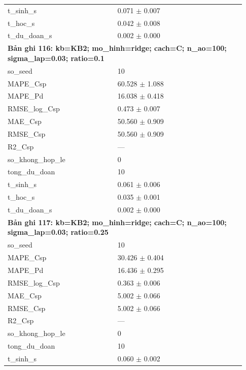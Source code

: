 \begin{longtable}{p{0.43\linewidth}p{0.50\linewidth}}
t\_\allowbreak sinh\_\allowbreak s & 0.071 $\pm$ 0.007 \\
t\_\allowbreak hoc\_\allowbreak s & 0.042 $\pm$ 0.008 \\
t\_\allowbreak du\_\allowbreak doan\_\allowbreak s & 0.002 $\pm$ 0.000 \\
\midrule
\multicolumn{2}{p{0.95\linewidth}}{\textbf{Bản ghi 116: kb=KB2; mo\_hinh=ridge; cach=C; n\_ao=100; sigma\_lap=0.03; ratio=0.1}} \\
so\_\allowbreak seed & 10 \\
MAPE\_\allowbreak Csp & 60.528 $\pm$ 1.088 \\
MAPE\_\allowbreak Pd & 16.038 $\pm$ 0.418 \\
RMSE\_\allowbreak log\_\allowbreak Csp & 0.473 $\pm$ 0.007 \\
MAE\_\allowbreak Csp & 50.560 $\pm$ 0.909 \\
RMSE\_\allowbreak Csp & 50.560 $\pm$ 0.909 \\
R2\_\allowbreak Csp & — \\
so\_\allowbreak khong\_\allowbreak hop\_\allowbreak le & 0 \\
tong\_\allowbreak du\_\allowbreak doan & 10 \\
t\_\allowbreak sinh\_\allowbreak s & 0.061 $\pm$ 0.006 \\
t\_\allowbreak hoc\_\allowbreak s & 0.035 $\pm$ 0.001 \\
t\_\allowbreak du\_\allowbreak doan\_\allowbreak s & 0.002 $\pm$ 0.000 \\
\midrule
\multicolumn{2}{p{0.95\linewidth}}{\textbf{Bản ghi 117: kb=KB2; mo\_hinh=ridge; cach=C; n\_ao=100; sigma\_lap=0.03; ratio=0.25}} \\
so\_\allowbreak seed & 10 \\
MAPE\_\allowbreak Csp & 30.426 $\pm$ 0.404 \\
MAPE\_\allowbreak Pd & 16.436 $\pm$ 0.295 \\
RMSE\_\allowbreak log\_\allowbreak Csp & 0.363 $\pm$ 0.006 \\
MAE\_\allowbreak Csp & 5.002 $\pm$ 0.066 \\
RMSE\_\allowbreak Csp & 5.002 $\pm$ 0.066 \\
R2\_\allowbreak Csp & — \\
so\_\allowbreak khong\_\allowbreak hop\_\allowbreak le & 0 \\
tong\_\allowbreak du\_\allowbreak doan & 10 \\
t\_\allowbreak sinh\_\allowbreak s & 0.060 $\pm$ 0.002 \\

\end{longtable}
